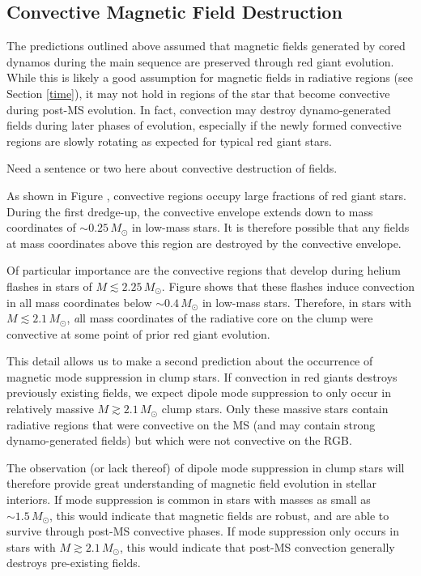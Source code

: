 \subsection{Convective Magnetic Field Destruction}

The predictions outlined above assumed that magnetic fields generated by cored dynamos during the main sequence are preserved through red giant evolution. While this is likely a good assumption for magnetic fields in radiative regions (see Section \ref{time}), it may not hold in regions of the star that become convective during post-MS evolution. In fact, convection may destroy dynamo-generated fields during later phases of evolution, especially if the newly formed convective regions are slowly rotating as expected for typical red giant stars.

Need a sentence or two here about convective destruction of fields. 

As shown in Figure \label{fig:DipoleHistConv}, convective regions occupy large fractions of red giant stars. During the first dredge-up, the convective envelope extends down to mass coordinates of $ \sim 0.25 \! \, M_\odot$ in low-mass stars. It is therefore possible that any fields at mass coordinates above this region are destroyed by the convective envelope.

Of particular importance are the convective regions that develop during helium flashes in stars of $M \lesssim 2.25 \, M_\odot$. Figure \label{fig:DipoleHistConv} shows that these flashes induce convection in all mass coordinates below $ \sim \! 0.4 \, M_\odot$ in low-mass stars. Therefore, in stars with $M \lesssim 2.1 \, M_\odot$, {\emph all} mass coordinates  of the radiative core on the clump were convective at some point of prior red giant evolution. 

This detail allows us to make a second prediction about the occurrence of magnetic mode suppression in clump stars. If convection in red giants destroys previously existing fields, we expect dipole mode suppression to only occur in relatively massive $M \gtrsim 2.1 \, M_\odot$ clump stars. Only these massive stars contain radiative regions that were convective on the MS (and may contain strong dynamo-generated fields) but which were not convective on the RGB. 

The observation (or lack thereof) of dipole mode suppression in clump stars will therefore provide great understanding of magnetic field evolution in stellar interiors. If mode suppression is common in stars with masses as small as $\sim \! 1.5 \, M_\odot$, this would indicate that magnetic fields are robust, and are able to survive through post-MS convective phases. If mode suppression only occurs in stars with $M \gtrsim 2.1 \, M_\odot$, this would indicate that post-MS convection generally destroys pre-existing fields. 